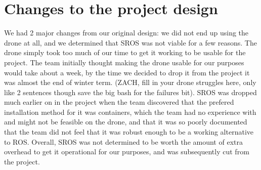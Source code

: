 \documentclass[IEEEtran,letterpaper,10pt,notitlepage,draftclsnofoot,onecolumn]{article}
\begin{document}
\section{Changes to the project design}
We had 2 major changes from our original design: we did not end up using 
the drone at all, and we determined that SROS was not viable for a few 
reasons. The drone simply took too much of our time to get it working to be 
usable for the project. The team initially thought making the drone usable 
for our purposes would take about a week, by the time we decided to drop it 
from the project it was almost the end of winter term. (ZACH, fill in your 
drone struggles here, only like 2 sentences though save the big bash for 
the failures bit). SROS was dropped much earlier on in the project when 
the team discovered that the prefered installation method for it was 
containers, which the team had no experience with and might not be feasible 
on the drone, and that it was so poorly documented that the team did not feel 
that it was robust enough to be a working alternative to ROS. Overall, SROS 
was not determined to be worth the amount of extra overhead to get it 
operational for our purposes, and was subsequently cut from the project.
\end{document}
